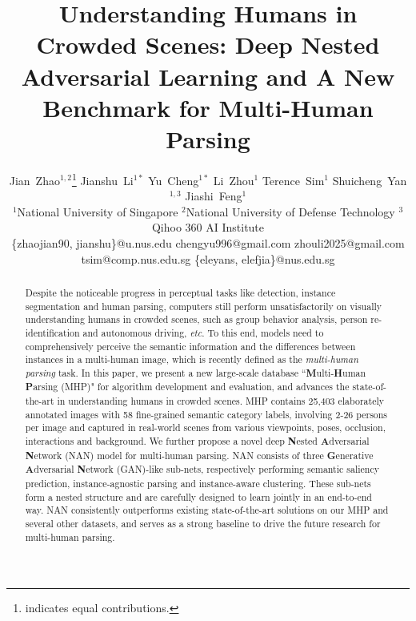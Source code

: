 \documentclass[10pt,twocolumn,letterpaper]{article}
\theoremstyle{definition}
\theoremstyle{remark}
\begin{document}
\title{Understanding Humans in Crowded Scenes: Deep Nested Adversarial Learning and A New Benchmark for Multi-Human Parsing}

\author{\normalsize{Jian~Zhao$^{1,2}$\thanks{indicates equal contributions.} \quad Jianshu~Li$^{1*}$ \quad Yu~Cheng$^{1*}$ \quad Li~Zhou$^{1}$ \quad Terence~Sim$^{1}$ \quad Shuicheng~Yan$^{1,3}$ \quad Jiashi~Feng$^{1}$}\\
	\small{$^{1}$National University of Singapore \quad $^{2}$National University of Defense Technology \quad  $^{3}$Qihoo 360 AI Institute} \\
	{\small  \{zhaojian90, 	jianshu\}@u.nus.edu \quad chengyu996@gmail.com  \quad zhouli2025@gmail.com} \\ {\small tsim@comp.nus.edu.sg  \quad \{eleyans, elefjia\}@nus.edu.sg}}

\maketitle

\begin{abstract}
	Despite the noticeable progress in perceptual tasks like detection, instance segmentation and human parsing, computers still perform unsatisfactorily on visually understanding humans in crowded scenes, such as group behavior analysis, person re-identification and autonomous driving, \emph{etc}. To this end, models need to comprehensively perceive the semantic information and the differences between instances in a multi-human image, which is recently defined as the \emph{multi-human parsing} task.  In this paper, we present a new large-scale database ``\textbf{M}ulti-\textbf{H}uman \textbf{P}arsing (MHP)" for algorithm development and evaluation, and advances the state-of-the-art in understanding humans in crowded scenes. MHP contains 25{,}403 elaborately annotated images with 58 fine-grained semantic category labels,  involving 2-26 persons per image and captured in real-world scenes from various viewpoints, poses, occlusion, interactions and background. We further propose a novel deep \textbf{N}ested \textbf{A}dversarial \textbf{N}etwork (NAN) model for multi-human parsing. NAN consists of three \textbf{G}enerative \textbf{A}dversarial \textbf{N}etwork (GAN)-like sub-nets, respectively performing semantic saliency prediction, instance-agnostic parsing and instance-aware clustering. These sub-nets form a nested structure and are carefully designed to learn jointly in an end-to-end way. NAN consistently outperforms existing state-of-the-art solutions on our MHP and several other datasets, and serves as a strong baseline to drive the future research for multi-human parsing.
\end{abstract}
\end{document}
